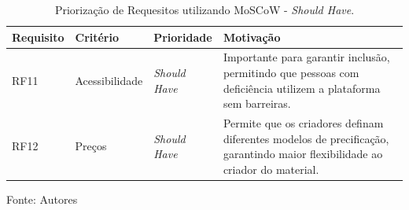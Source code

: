 \begin{apendicesenv}
\begin{table}[h]
    \centering
    \caption{Priorização de Requesitos utilizando MoSCoW - \textit{Should Have}.}
    \label{tab:priorizacao_moscow2}
    \begin{adjustbox}{width=\textwidth}
        \begin{tabular}{|p{2.5cm}|p{5cm}|p{5cm}|p{4cm}|}
            \hline
            \textbf{Requisito} & \textbf{Critério} & \textbf{Prioridade} & \textbf{Motivação} \\
            \hline
            RF11 & Acessibilidade & \textit{Should Have} & Importante para garantir inclusão, permitindo que pessoas com deficiência utilizem a plataforma sem barreiras. \\
            \hline
            RF12 & Preços & \textit{Should Have} & Permite que os criadores definam diferentes modelos de precificação, garantindo maior flexibilidade ao criador do material. \\
            \hline
        \end{tabular}
    \end{adjustbox}
    \vspace{5mm}
    {\footnotesize Fonte: Autores} 
\end{table}



\end{apendicesenv}

